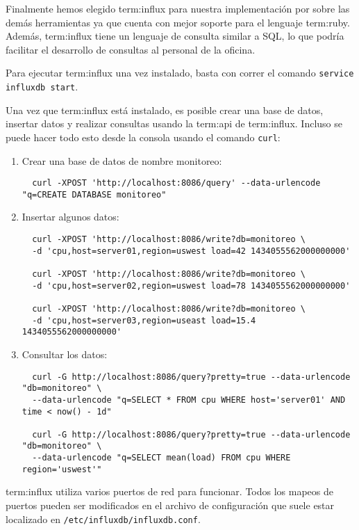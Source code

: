 Finalmente hemos elegido \gls{term:influx} para nuestra implementación por
sobre las demás herramientas ya que cuenta con mejor soporte para el lenguaje
\gls{term:ruby}. Además, \gls{term:influx} tiene un lenguaje de consulta similar
a SQL, lo que podría facilitar el desarrollo de consultas al personal de la
oficina.

Para ejecutar \gls{term:influx} una vez instalado, basta con correr el comando
\lstinline{service influxdb start}.

Una vez que \gls{term:influx} está instalado, es posible crear una base de
datos, insertar datos y realizar consultas usando la \gls{term:api} de
\gls{term:influx}. Incluso se puede hacer todo esto desde la consola usando el
comando \lstinline{curl}:

\begin{enumerate}
  \item{Crear una base de datos de nombre monitoreo:}
  \begin{lstlisting}
  curl -XPOST 'http://localhost:8086/query' --data-urlencode "q=CREATE DATABASE monitoreo"
  \end{lstlisting}

  \item{Insertar algunos datos:}
  \begin{lstlisting}
  curl -XPOST 'http://localhost:8086/write?db=monitoreo \
  -d 'cpu,host=server01,region=uswest load=42 1434055562000000000'

  curl -XPOST 'http://localhost:8086/write?db=monitoreo \
  -d 'cpu,host=server02,region=uswest load=78 1434055562000000000'

  curl -XPOST 'http://localhost:8086/write?db=monitoreo \
  -d 'cpu,host=server03,region=useast load=15.4 1434055562000000000'
  \end{lstlisting}


  \item{Consultar los datos:}
  \begin{lstlisting}
  curl -G http://localhost:8086/query?pretty=true --data-urlencode "db=monitoreo" \
  --data-urlencode "q=SELECT * FROM cpu WHERE host='server01' AND time < now() - 1d"

  curl -G http://localhost:8086/query?pretty=true --data-urlencode "db=monitoreo" \
  --data-urlencode "q=SELECT mean(load) FROM cpu WHERE region='uswest'"
  \end{lstlisting}
\end{enumerate}

\gls{term:influx} utiliza varios puertos de red para funcionar. Todos los
mapeos de puertos pueden ser modificados en el archivo de configuración que
suele estar localizado en \texttt{/etc/influxdb/influxdb.conf}.

